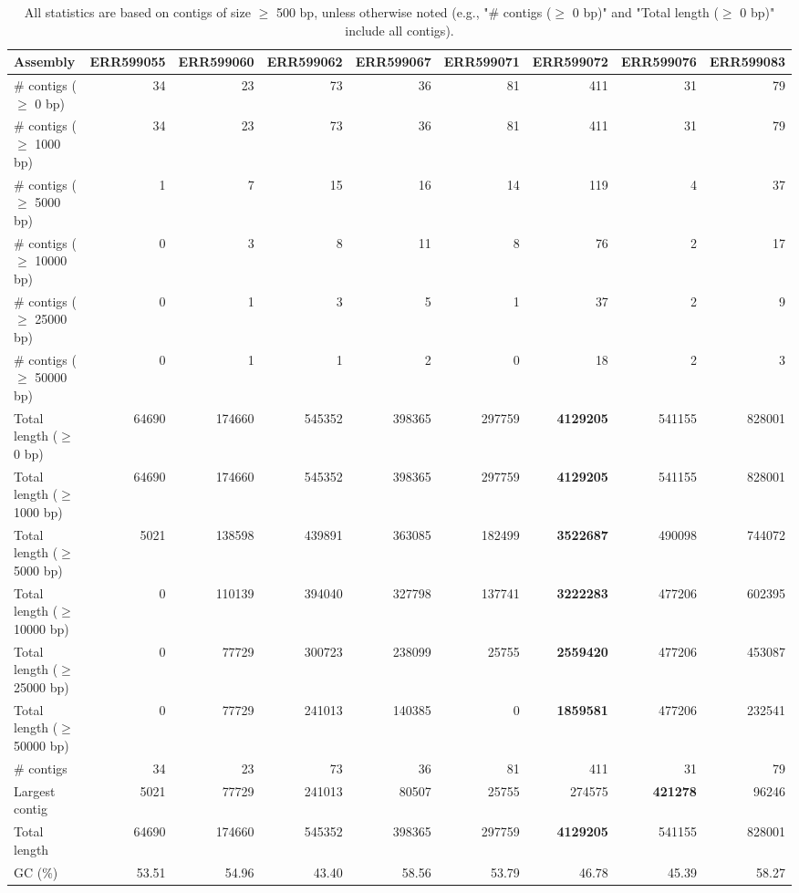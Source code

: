 \documentclass[12pt,a4paper]{article}
\begin{document}
\begin{table}[ht]
\begin{center}
\caption{All statistics are based on contigs of size $\geq$ 500 bp, unless otherwise noted (e.g., "\# contigs ($\geq$ 0 bp)" and "Total length ($\geq$ 0 bp)" include all contigs).}
\begin{tabular}{|l*{8}{|r}|}
\hline
Assembly & ERR599055 & ERR599060 & ERR599062 & ERR599067 & ERR599071 & ERR599072 & ERR599076 & ERR599083 \\ \hline
\# contigs ($\geq$ 0 bp) & 34 & 23 & 73 & 36 & 81 & 411 & 31 & 79 \\ \hline
\# contigs ($\geq$ 1000 bp) & 34 & 23 & 73 & 36 & 81 & 411 & 31 & 79 \\ \hline
\# contigs ($\geq$ 5000 bp) & 1 & 7 & 15 & 16 & 14 & 119 & 4 & 37 \\ \hline
\# contigs ($\geq$ 10000 bp) & 0 & 3 & 8 & 11 & 8 & 76 & 2 & 17 \\ \hline
\# contigs ($\geq$ 25000 bp) & 0 & 1 & 3 & 5 & 1 & 37 & 2 & 9 \\ \hline
\# contigs ($\geq$ 50000 bp) & 0 & 1 & 1 & 2 & 0 & 18 & 2 & 3 \\ \hline
Total length ($\geq$ 0 bp) & 64690 & 174660 & 545352 & 398365 & 297759 & {\bf 4129205} & 541155 & 828001 \\ \hline
Total length ($\geq$ 1000 bp) & 64690 & 174660 & 545352 & 398365 & 297759 & {\bf 4129205} & 541155 & 828001 \\ \hline
Total length ($\geq$ 5000 bp) & 5021 & 138598 & 439891 & 363085 & 182499 & {\bf 3522687} & 490098 & 744072 \\ \hline
Total length ($\geq$ 10000 bp) & 0 & 110139 & 394040 & 327798 & 137741 & {\bf 3222283} & 477206 & 602395 \\ \hline
Total length ($\geq$ 25000 bp) & 0 & 77729 & 300723 & 238099 & 25755 & {\bf 2559420} & 477206 & 453087 \\ \hline
Total length ($\geq$ 50000 bp) & 0 & 77729 & 241013 & 140385 & 0 & {\bf 1859581} & 477206 & 232541 \\ \hline
\# contigs & 34 & 23 & 73 & 36 & 81 & 411 & 31 & 79 \\ \hline
Largest contig & 5021 & 77729 & 241013 & 80507 & 25755 & 274575 & {\bf 421278} & 96246 \\ \hline
Total length & 64690 & 174660 & 545352 & 398365 & 297759 & {\bf 4129205} & 541155 & 828001 \\ \hline
GC (\%) & 53.51 & 54.96 & 43.40 & 58.56 & 53.79 & 46.78 & 45.39 & 58.27 \\ \hline

\end{tabular}
\end{center}
\end{table}
\end{document}
